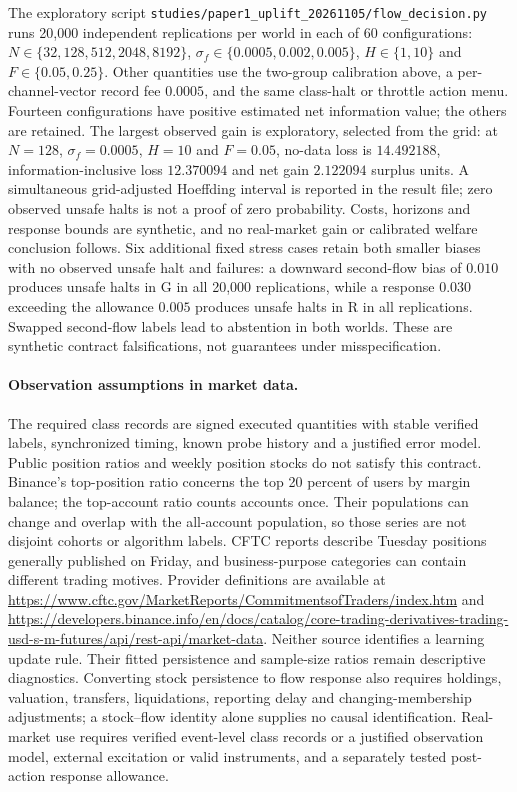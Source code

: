 The exploratory script
\nolinkurl{studies/paper1_uplift_20261105/flow_decision.py}
runs 20,000 independent replications per world in each of 60 configurations: $N\in\{32,\allowbreak128,\allowbreak512,\allowbreak2048,\allowbreak8192\}$, $\sigma_f\in\{0.0005,0.002,0.005\}$, $H\in\{1,10\}$ and $F\in\{0.05,0.25\}$. Other quantities use the two-group calibration above, a per-channel-vector record fee $0.0005$, and the same class-halt or throttle action menu. Fourteen configurations have positive estimated net information value; the others are retained. The largest observed gain is exploratory, selected from the grid: at $N=128$, $\sigma_f=0.0005$, $H=10$ and $F=0.05$, no-data loss is $14.492188$, information-inclusive loss $12.370094$ and net gain $2.122094$ surplus units. A simultaneous grid-adjusted Hoeffding interval is reported in the result file; zero observed unsafe halts is not a proof of zero probability. Costs, horizons and response bounds are synthetic, and no real-market gain or calibrated welfare conclusion follows. Six additional fixed stress cases retain both smaller biases with no observed unsafe halt and failures: a downward second-flow bias of $0.010$ produces unsafe halts in G in all 20,000 replications, while a response $0.030$ exceeding the allowance $0.005$ produces unsafe halts in R in all replications. Swapped second-flow labels lead to abstention in both worlds. These are synthetic contract falsifications, not guarantees under misspecification.

\paragraph{Observation assumptions in market data.}
The required class records are signed executed quantities with stable verified labels, synchronized timing, known probe history and a justified error model. Public position ratios and weekly position stocks do not satisfy this contract. Binance's top-position ratio concerns the top 20 percent of users by margin balance; the top-account ratio counts accounts once. Their populations can change and overlap with the all-account population, so those series are not disjoint cohorts or algorithm labels. CFTC reports describe Tuesday positions generally published on Friday, and business-purpose categories can contain different trading motives. Provider definitions are available at \url{https://www.cftc.gov/MarketReports/CommitmentsofTraders/index.htm} and \url{https://developers.binance.info/en/docs/catalog/core-trading-derivatives-trading-usd-s-m-futures/api/rest-api/market-data}. Neither source identifies a learning update rule. Their fitted persistence and sample-size ratios remain descriptive diagnostics. Converting stock persistence to flow response also requires holdings, valuation, transfers, liquidations, reporting delay and changing-membership adjustments; a stock--flow identity alone supplies no causal identification. Real-market use requires verified event-level class records or a justified observation model, external excitation or valid instruments, and a separately tested post-action response allowance.

